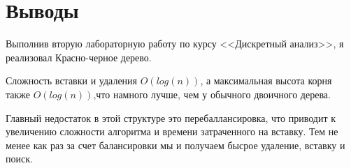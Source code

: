 \section{Выводы}
Выполнив вторую лабораторную работу по курсу <<Дискретный анализ>>, я реализовал Красно-черное дерево.

Сложность вставки и удаления $O(log(n))$, а максимальная высота корня также $O(log(n))$,что намного лучше, чем у обычного двоичного дерева.

Главный недостаток в этой структуре это перебаллансировка, что приводит к увеличению сложности алгоритма и времени затраченного на вставку. Тем не менее как раз за счет балансировки мы и получаем бысрое удаление, вставку и поиск.
\pagebreak
